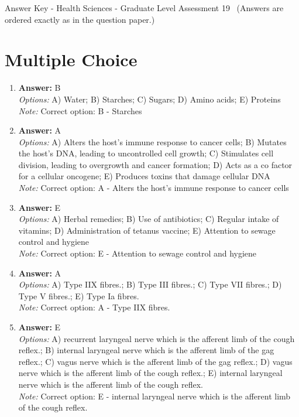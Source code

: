 \documentclass[12pt]{article}
\begin{document}
\begin{center}
Answer Key - Health Sciences - Graduate Level Assessment 19 \
\small (Answers are ordered exactly as in the question paper.)
\end{center}

\section*{Multiple Choice}
\begin{enumerate}[label=\arabic*.]
\item \textbf{Answer:} B
\\ \textit{Options:} A) Water; B) Starches; C) Sugars; D) Amino acids; E) Proteins
\\ \textit{Note:} Correct option: B - Starches
\item \textbf{Answer:} A
\\ \textit{Options:} A) Alters the host's immune response to cancer cells; B) Mutates the host's DNA, leading to uncontrolled cell growth; C) Stimulates cell division, leading to overgrowth and cancer formation; D) Acts as a co factor for a cellular oncogene; E) Produces toxins that damage cellular DNA
\\ \textit{Note:} Correct option: A - Alters the host's immune response to cancer cells
\item \textbf{Answer:} E
\\ \textit{Options:} A) Herbal remedies; B) Use of antibiotics; C) Regular intake of vitamins; D) Administration of tetanus vaccine; E) Attention to sewage control and hygiene
\\ \textit{Note:} Correct option: E - Attention to sewage control and hygiene
\item \textbf{Answer:} A
\\ \textit{Options:} A) Type IIX fibres.; B) Type III fibres.; C) Type VII fibres.; D) Type V fibres.; E) Type Ia fibres.
\\ \textit{Note:} Correct option: A - Type IIX fibres.
\item \textbf{Answer:} E
\\ \textit{Options:} A) recurrent laryngeal nerve which is the afferent limb of the cough reflex.; B) internal laryngeal nerve which is the afferent limb of the gag reflex.; C) vagus nerve which is the afferent limb of the gag reflex.; D) vagus nerve which is the afferent limb of the cough reflex.; E) internal laryngeal nerve which is the afferent limb of the cough reflex.
\\ \textit{Note:} Correct option: E - internal laryngeal nerve which is the afferent limb of the cough reflex.
\end{enumerate}
\end{document}
